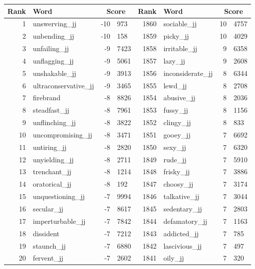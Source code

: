 \begin{table}[tbp]
    \begin{tabular}{| rlr@{.}l | rlr@{.}l |}
    \hline
    \textbf{Rank} & \textbf{Word} & \multicolumn{2}{c|}{\textbf{Score}} & \textbf{Rank} & \textbf{Word} & \multicolumn{2}{c|}{\textbf{Score}} \\
    \hline
    1 & unswerving\_jj & -10 & 973    &    1860 & sociable\_jj & 10 & 4757 \\
    2 & unbending\_jj & -10 & 158    &    1859 & picky\_jj & 10 & 4029 \\
    3 & unfailing\_jj & -9 & 7423    &    1858 & irritable\_jj & 9 & 6358 \\
    4 & unflagging\_jj & -9 & 5061    &    1857 & lazy\_jj & 9 & 2608 \\
    5 & unshakable\_jj & -9 & 3913    &    1856 & inconsiderate\_jj & 8 & 6344 \\
    6 & ultraconservative\_jj & -9 & 3465    &    1855 & lewd\_jj & 8 & 2708 \\
    7 & firebrand & -8 & 8826    &    1854 & abusive\_jj & 8 & 2036 \\
    8 & steadfast\_jj & -8 & 7961    &    1853 & fussy\_jj & 8 & 1156 \\
    9 & unflinching\_jj & -8 & 3822    &    1852 & clingy\_jj & 8 & 833 \\
    10 & uncompromising\_jj & -8 & 3471    &    1851 & gooey\_jj & 7 & 6692 \\
    11 & untiring\_jj & -8 & 2820    &    1850 & sexy\_jj & 7 & 6320 \\
    12 & unyielding\_jj & -8 & 2711    &    1849 & rude\_jj & 7 & 5910 \\
    13 & trenchant\_jj & -8 & 1214    &    1848 & frisky\_jj & 7 & 3886 \\
    14 & oratorical\_jj & -8 & 192    &    1847 & choosy\_jj & 7 & 3174 \\
    15 & unquestioning\_jj & -7 & 9994    &    1846 & talkative\_jj & 7 & 3044 \\
    16 & secular\_jj & -7 & 8617    &    1845 & sedentary\_jj & 7 & 2803 \\
    17 & imperturbable\_jj & -7 & 7842    &    1844 & defamatory\_jj & 7 & 1163 \\
    18 & dissident & -7 & 7212    &    1843 & addicted\_jj & 7 & 785 \\
    19 & staunch\_jj & -7 & 6880    &    1842 & lascivious\_jj & 7 & 497 \\
    20 & fervent\_jj & -7 & 2602    &    1841 & oily\_jj & 7 & 320 \\

\end{tabular}
\end{table}
